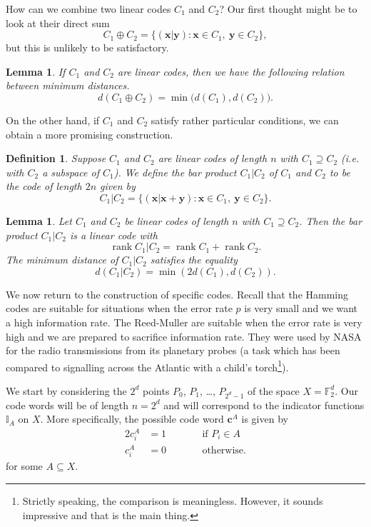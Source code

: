 \documentclass[12pt,a4paper]{article}
\theoremstyle{plain}
\newtheorem{lemma}[theorem]{Lemma}
\newtheorem{definition}[theorem]{Definition}
\theoremstyle{definition}
\newcommand{\rank}{\operatorname{rank}}
\begin{document}
How can we combine two linear codes $C_{1}$ and $C_{2}$?
Our first thought might be to look at their
direct sum
\[C_{1}\oplus C_{2}=\{({\mathbf x}|{\mathbf y})
:{\mathbf x}\in C_{1},\ {\mathbf y}\in C_{2}\},\]
but this is unlikely to be satisfactory.
\begin{lemma} If $C_{1}$ and $C_{2}$ are linear codes,
then we have the following relation between
minimum distances.
\[d(C_{1}\oplus C_{2})=\min\big(d(C_{1}),d(C_{2})\big).\]
\end{lemma}
On the other hand, if $C_{1}$ and $C_{2}$ satisfy
rather particular conditions, we can obtain
a more promising construction.
\begin{definition} Suppose $C_{1}$ and $C_{2}$
are linear codes of length $n$
with $C_{1}\supseteq C_{2}$
(i.e. with $C_{2}$ a subspace of $C_{1}$). We define
the \emph{bar product} $C_{1}|C_{2}$ of $C_{1}$
and $C_{2}$ to be the code of length $2n$ given by
\[C_{1}|C_{2}=\{({\mathbf x}|{\mathbf x}+{\mathbf y})
:{\mathbf x}\in C_{1},\ {\mathbf y}\in C_{2}\}.\]
\end{definition}
\begin{lemma} Let $C_{1}$ and $C_{2}$
be linear codes of length $n$
with $C_{1}\supseteq C_{2}$. Then
the bar product $C_{1}|C_{2}$
is a linear code with
\[\rank C_{1}|C_{2}=\rank C_{1}+\rank C_{2}.\]
The minimum distance of $C_{1}|C_{2}$ satisfies
the equality
\[d(C_{1}|C_{2})=\min(2d(C_{1}),d(C_{2})).\]
\end{lemma}
We now return to the construction of specific codes.
Recall that the Hamming codes are suitable for situations
when the error rate $p$ is very small and we want
a high information rate. The Reed-Muller are suitable
when the error rate is very high and we are prepared
to sacrifice information rate. They were used by NASA
for the radio transmissions from its planetary probes
(a task which has been compared
to signalling across
the Atlantic with a child's torch\footnote{Strictly
speaking, the comparison is meaningless. However,
it sounds impressive and that is the main thing.}).

We start by considering the $2^{d}$ points $P_{0}$, $P_{1}$,
\dots, $P_{2^{d}-1}$ of the space
$X={\mathbb F}_{2}^{d}$. Our code
words will be of length $n=2^{d}$ and will
correspond to the indicator functions
${\mathbb I}_{A}$ on $X$. More specifically,
the possible code word ${\mathbf c}^{A}$ is given
by
\begin{alignat*}{2}
c_{i}^{A}&=1&&\qquad\text{if $P_{i}\in A$}\\
c_{i}^{A}&=0&&\qquad\text{otherwise}.
\end{alignat*}
for some $A\subseteq X$.
\end{document}

